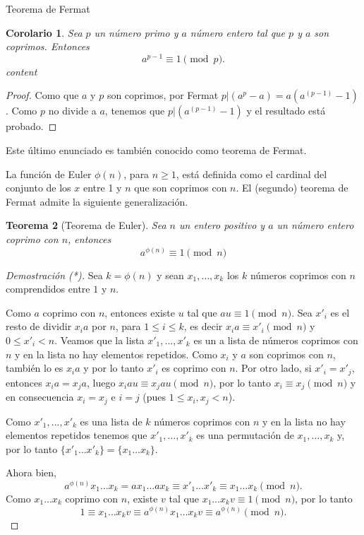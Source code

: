\documentclass[11pt,spanish,makeidx]{amsbook}
\newtheorem{teorema}{Teorema}[section]
\newtheorem{corolario}[teorema]{Corolario}
\theoremstyle{definition}
\theoremstyle{remark}
\begin{document}
\begin{section}{Teorema de Fermat}
\begin{corolario}  Sea $p$ un número primo y $a$ número entero tal que $p$ y $a$ son coprimos. Entonces
	$$
	a^{p-1}\equiv 1\pmod{p}.
	$$
	content
\end{corolario}
\begin{proof}
	Como que $a$ y $p$ son coprimos, por Fermat $p|(a^p -a)=a(a^{(p-1)} -1)$. Como $p$ no divide a $a$, tenemos que $p|(a^{(p-1)} -1)$ y el resultado  está probado.
\end{proof}

Este último enunciado es también conocido como teorema de Fermat.

La función de Euler   $\phi(n)$, para $n\ge 1$, está definida como el cardinal del conjunto de los $x$ entre 1 y $n$ que son coprimos con $n$. El (segundo) teorema de Fermat admite la siguiente generalización.

\begin{teorema}[Teorema de Euler] 
	Sea $n$ un entero positivo y $a$ un número entero coprimo con $n$, entonces
	\begin{equation*}
		a^{\phi(n)} \equiv 1\pmod{n}
	\end{equation*}
\end{teorema}
\begin{proof}[Demostración (*)] 

Sea $k=\phi(n)$ y sean $x_1,\ldots,x_k$ los $k$ números coprimos con $n$ comprendidos entre $1$ y $n$. 

Como $a$ coprimo con $n$, entonces existe $u$  tal que   $au \equiv 1 \pmod{n}$.   Sea $x'_i$  es el resto de dividir $x_ia$ por $n$, para $1 \le i \le k$, es decir  $x_ia \equiv x'_i \pmod{n}$ y $0 \le x'_i < n$. Veamos que la lista $x'_1,\ldots,x'_k$ es un a lista de números coprimos con $n$ y en la lista no hay elementos repetidos.  
Como $x_i$ y $a$ son coprimos con $n$, también lo es $x_ia$ y por lo tanto $x'_i$  es coprimo con $n$. Por  otro lado, si $x'_i = x'_j$,  entonces $x_ia = x_ja $, luego $x_iau \equiv x_jau \pmod{n}$, por lo tanto  $x_i \equiv x_j \pmod{n}$ y en consecuencia $x_i = x_j$ e $i=j$ (pues $1 \le x_i,x_j < n$).

Como $x'_1,\ldots,x'_k$ es una lista de $k$ números coprimos con $n$ y en la lista no hay elementos repetidos tenemos que $x'_1,\ldots,x'_k$ es una permutación de   $x_1,\ldots,x_k$ y, por lo tanto $\{x'_1\ldots x'_k\} = \{x_1 \ldots x_k\}$.

Ahora bien,  
\begin{equation*}
	a^{\phi(n)}x_1\ldots x_k =ax_1\ldots ax_k \equiv x'_1\ldots x'_k \equiv x_1\ldots x_k \pmod{n}.
\end{equation*}
 Como $x_1\ldots x_k$ coprimo con $n$, existe $v$ tal que $x_1\ldots x_kv\equiv 1\pmod{n}$, por lo tanto
 \begin{equation*}
 	1 \equiv  x_1\ldots x_kv  \equiv a^{\phi(n)}x_1\ldots x_k v \equiv a^{\phi(n)} \pmod{n}.
 \end{equation*}
\end{proof}


\end{section}
\end{document}
